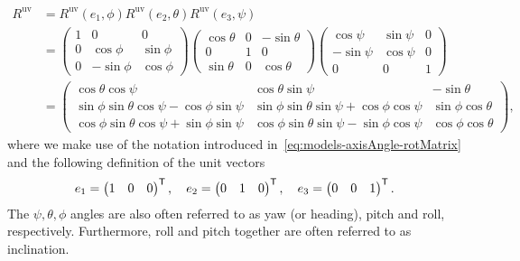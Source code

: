 {\footnotesize{
\begin{align}
\label{eq:models-rotMatrix}
R^\text{uv} &= R^\text{uv}(e_1, \phi) R^\text{uv}(e_2, \theta) R^\text{uv}(e_3, \psi) \\
&= \begin{pmatrix} 1 & 0 & 0 \\ 0 & \cos \phi & \sin \phi \\ 0 & -\sin \phi & \cos \phi \end{pmatrix}
\begin{pmatrix} \cos \theta & 0 & -\sin \theta \\ 0 & 1 & 0 \\ \sin \theta & 0 & \cos \theta \end{pmatrix}
\begin{pmatrix} \cos \psi & \sin \psi & 0 \\ -\sin \psi & \cos \psi & 0 \\ 0 & 0 & 1 \end{pmatrix} \nonumber \\
&= \begin{pmatrix} \cos \theta \cos \psi & \cos \theta \sin \psi & -\sin \theta \\ 
\sin \phi \sin \theta \cos \psi - \cos \phi \sin \psi & \sin \phi \sin \theta \sin \psi + \cos \phi \cos \psi & \sin \phi \cos \theta \\ 
\cos \phi \sin \theta \cos \psi + \sin \phi \sin \psi & \cos \phi \sin \theta \sin \psi - \sin \phi \cos \psi & \cos \phi \cos \theta \end{pmatrix},\nonumber
\end{align}}}%
where we make use of the notation introduced in~\eqref{eq:models-axisAngle-rotMatrix} and the following definition of the unit vectors 
\begin{align}
e_1 = \begin{pmatrix} 1 & 0 & 0 \end{pmatrix}^{\mathsf{T}}, \quad e_2 = \begin{pmatrix} 0 & 1 & 0 \end{pmatrix}^{\mathsf{T}}, \quad e_3 = \begin{pmatrix} 0 & 0 & 1 \end{pmatrix}^{\mathsf{T}}.
\end{align}
The $\psi, \theta, \phi$ angles are also often referred to as yaw (or heading), pitch and roll, respectively. Furthermore, roll and pitch together are often referred to as inclination. 

